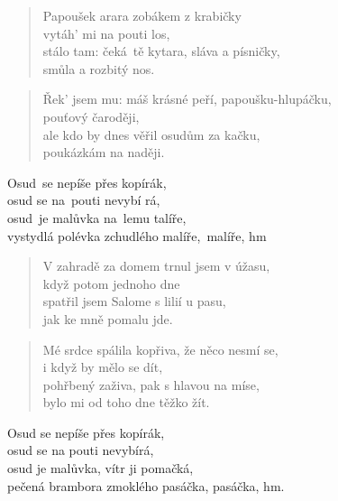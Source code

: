 \begin{song}{}
\begin{verse}
   Papoušek arara zobákem z krabičky \\
   vytáh' mi na pouti los, \\
   stálo tam: čeká~tě kytara, sláva a písničky, \\
   smůla a rozbitý nos.
\end{verse}
\begin{verse}
   Řek' jsem mu:  
   máš krásné peří, 
   papoušku-hlupáčku, \\
   pouťový čaroději, \\
   ale kdo by dnes věřil  
   osudům za kačku, \\ 
   poukázkám na naději.
\end{verse}
\begin{refren}
   Osud~se nepíše přes kopírák, \\
   osud se na~pouti nevybí rá, \\
   osud~je malůvka na~lemu talíře, \\
   vystydlá polévka zchudlého malíře,~malíře, hm        ~
\end{refren}
\begin{verse}
   V zahradě za domem trnul jsem v úžasu, \\
   když potom jednoho dne \\
   spatřil jsem Salome s lilií u pasu, \\
   jak ke mně pomalu jde.
\end{verse}
\begin{verse}
   Mé srdce spálila kopřiva, že něco nesmí se, \\
   i když by mělo se dít, \\
   pohřbený zaživa, pak s hlavou na míse, \\
   bylo mi od toho dne těžko žít.
\end{verse}
\begin{refren}
   Osud se nepíše přes kopírák, \\
   osud se na pouti nevybírá, \\
   osud je malůvka, vítr ji pomačká, \\
   pečená brambora zmoklého pasáčka, pasáčka, hm.
\end{refren}

\end{song}
